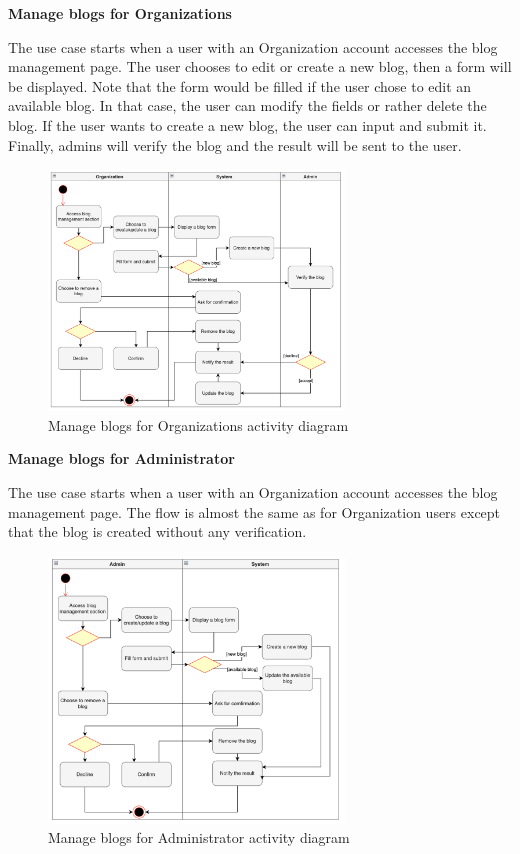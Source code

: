 \textbf{Manage blogs for Organizations}

The use case starts when a user with an Organization account accesses the blog management page. The user chooses to edit or create a new blog, then a form will be displayed. Note that the form would be filled if the user chose to edit an available blog. In that case, the user can modify the fields or rather delete the blog. If the user wants to create a new blog, the user can input and submit it. Finally, admins will verify the blog and the result will be sent to the user.

\begin {figure}[H]
\centering
\includegraphics[width=0.7\textwidth]{Figures/manage_blog_org.png}
\caption{Manage blogs for Organizations activity diagram}
\label{fig:manage-blog}
\end{figure}

\textbf{Manage blogs for Administrator}

The use case starts when a user with an Organization account accesses the blog management page. The flow is almost the same as for Organization users except that the blog is created without any verification.

\begin {figure}[H]
\centering
\includegraphics[width=0.7\textwidth]{Figures/manage_blog_admin.png}
\caption{Manage blogs for Administrator activity diagram}
\label{fig:manage-blog-admin}
\end{figure}

